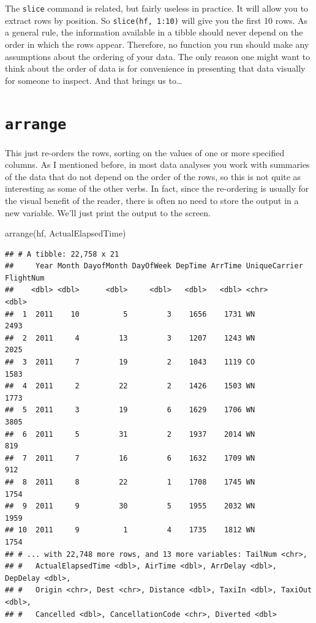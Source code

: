 \documentclass[
]{book}
\newenvironment{Shaded}{\begin{snugshade}}{\end{snugshade}}
\newcommand{\FunctionTok}[1]{\textcolor[rgb]{0.00,0.00,0.00}{#1}}
\newcommand{\NormalTok}[1]{#1}
\begin{document}
The \texttt{slice} command is related, but fairly useless in practice. It will allow you to extract rows by position. So \texttt{slice(hf,\ 1:10)} will give you the first 10 rows. As a general rule, the information available in a tibble should never depend on the order in which the rows appear. Therefore, no function you run should make any assumptions about the ordering of your data. The only reason one might want to think about the order of data is for convenience in presenting that data visually for someone to inspect. And that brings us to\ldots{}

\hypertarget{manipulating-arrange}{%
\section{\texorpdfstring{\texttt{arrange}}{arrange}}\label{manipulating-arrange}}

This just re-orders the rows, sorting on the values of one or more specified columns. As I mentioned before, in most data analyses you work with summaries of the data that do not depend on the order of the rows, so this is not quite as interesting as some of the other verbs. In fact, since the re-ordering is usually for the visual benefit of the reader, there is often no need to store the output in a new variable. We'll just print the output to the screen.

\begin{Shaded}
\begin{Highlighting}[]
\FunctionTok{arrange}\NormalTok{(hf, ActualElapsedTime)}
\end{Highlighting}
\end{Shaded}

\begin{verbatim}
## # A tibble: 22,758 x 21
##     Year Month DayofMonth DayOfWeek DepTime ArrTime UniqueCarrier FlightNum
##    <dbl> <dbl>      <dbl>     <dbl>   <dbl>   <dbl> <chr>             <dbl>
##  1  2011    10          5         3    1656    1731 WN                 2493
##  2  2011     4         13         3    1207    1243 WN                 2025
##  3  2011     7         19         2    1043    1119 CO                 1583
##  4  2011     2         22         2    1426    1503 WN                 1773
##  5  2011     3         19         6    1629    1706 WN                 3805
##  6  2011     5         31         2    1937    2014 WN                  819
##  7  2011     7         16         6    1632    1709 WN                  912
##  8  2011     8         22         1    1708    1745 WN                 1754
##  9  2011     9         30         5    1955    2032 WN                 1959
## 10  2011     9          1         4    1735    1812 WN                 1754
## # ... with 22,748 more rows, and 13 more variables: TailNum <chr>,
## #   ActualElapsedTime <dbl>, AirTime <dbl>, ArrDelay <dbl>, DepDelay <dbl>,
## #   Origin <chr>, Dest <chr>, Distance <dbl>, TaxiIn <dbl>, TaxiOut <dbl>,
## #   Cancelled <dbl>, CancellationCode <chr>, Diverted <dbl>
\end{verbatim}
\end{document}
